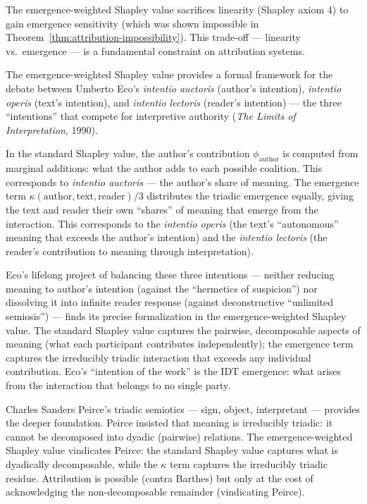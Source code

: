 \begin{remark}
The emergence-weighted Shapley value sacrifices linearity (Shapley axiom 4)
to gain emergence sensitivity (which was shown impossible in
Theorem~\ref{thm:attribution-impossibility}).  This trade-off --- linearity
vs.\ emergence --- is a fundamental constraint on attribution systems.
\end{remark}

\begin{interpretation}
\label{interp:ch21:peirce_eco_authorship}
The emergence-weighted Shapley value provides a formal framework for the
debate between Umberto Eco's \textit{intentio auctoris} (author's
intention), \textit{intentio operis} (text's intention), and
\textit{intentio lectoris} (reader's intention) --- the three ``intentions''
that compete for interpretive authority (\textit{The Limits of
Interpretation}, 1990).

In the standard Shapley value, the author's contribution $\phi_{\text{author}}$
is computed from marginal additions: what the author adds to each possible
coalition.  This corresponds to \textit{intentio auctoris} --- the author's
share of meaning.  The emergence term $\kappa(\text{author}, \text{text},
\text{reader})/3$ distributes the triadic emergence equally, giving the
text and reader their own ``shares'' of meaning that emerge from the
interaction.  This corresponds to the \textit{intentio operis} (the text's
``autonomous'' meaning that exceeds the author's intention) and the
\textit{intentio lectoris} (the reader's contribution to meaning
through interpretation).

Eco's lifelong project of balancing these three intentions --- neither
reducing meaning to author's intention (against the ``hermetics of
suspicion'') nor dissolving it into infinite reader response (against
deconstructive ``unlimited semiosis'') --- finds its precise formalization
in the emergence-weighted Shapley value.  The standard Shapley value
captures the pairwise, decomposable aspects of meaning (what each
participant contributes independently); the emergence term captures the
irreducibly triadic interaction that exceeds any individual contribution.
Eco's ``intention of the work'' is the IDT emergence: what arises from the
interaction that belongs to no single party.

Charles Sanders Peirce's triadic semiotics --- sign, object, interpretant ---
provides the deeper foundation.  Peirce insisted that meaning is
irreducibly triadic: it cannot be decomposed into dyadic (pairwise)
relations.  The emergence-weighted Shapley value vindicates Peirce:
the standard Shapley value captures what is dyadically decomposable,
while the $\kappa$ term captures the irreducibly triadic residue.
Attribution is possible (contra Barthes) but only at the cost of
acknowledging the non-decomposable remainder (vindicating Peirce).
\end{interpretation}


